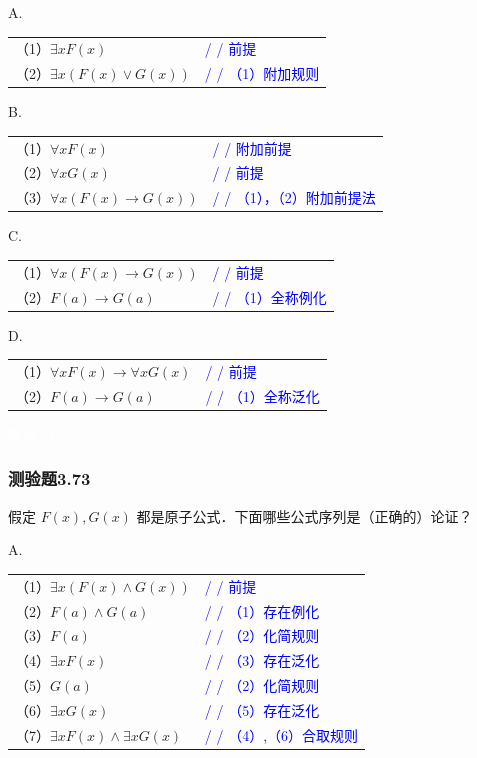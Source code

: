 \documentclass[UTF8, heading=true]{ctexart}
\begin{document}
A.

\begin{tabular}{ll}
  （1）$\exists x F(x)$ & \textcolor{blue}{/ / 前提} \\
  （2）$\exists x(F(x) \vee G(x))$ & \textcolor{blue}{/ / （1）附加规则}
\end{tabular}


B.

\begin{tabular}{ll}
  （1）$\forall x F(x)$ & \textcolor{blue}{/ / 附加前提} \\
  （2）$\forall x G(x)$ & \textcolor{blue}{/ / 前提} \\
  （3）$\forall x(F(x) \rightarrow G(x))$ & \textcolor{blue}{/ / （1），（2）附加前提法}
\end{tabular}


C.

\begin{tabular}{ll}
  （1）$\forall x(F(x) \rightarrow G(x))$ & \textcolor{blue}{/ / 前提} \\
  （2）$F(a) \rightarrow G(a)$ & \textcolor{blue}{/ / （1）全称例化}
\end{tabular}

D.

\begin{tabular}{ll}
  （1）$\forall x F(x) \rightarrow \forall x G(x)$ & \textcolor{blue}{/ / 前提} \\
  （2）$F(a) \rightarrow G(a)$ & \textcolor{blue}{/ / （1）全称泛化}
\end{tabular}

\textcolor{white}{答案：C}

\subsubsection{测验题3.73}

假定 $F(x), G(x)$ 都是原子公式．下面哪些公式序列是（正确的）论证？

A.

\begin{tabular}{ll}
  （1）$\exists x(F(x) \wedge G(x))$ & \textcolor{blue}{/ / 前提} \\
  （2）$F(a) \wedge G(a)$ & \textcolor{blue}{/ / （1）存在例化} \\
  （3）$F(a)$ & \textcolor{blue}{/ / （2）化简规则} \\
  （4）$\exists x F(x)$ & \textcolor{blue}{/ / （3）存在泛化} \\
  （5）$G(a)$ & \textcolor{blue}{/ / （2）化简规则} \\
  （6）$\exists x G(x)$ & \textcolor{blue}{/ / （5）存在泛化} \\
  （7）$\exists x F(x) \wedge \exists x G(x)$ & \textcolor{blue}{/ / （4）,（6）合取规则}
\end{tabular}
\end{document}
